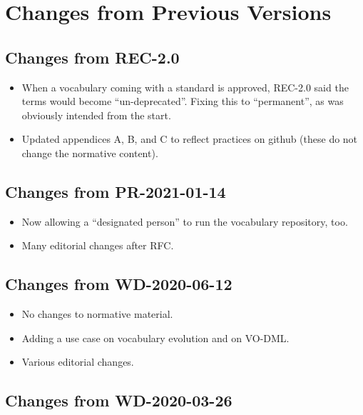 \documentclass[11pt,a4paper]{ivoa}
\begin{document}
\section{Changes from Previous Versions}

\subsection{Changes from REC-2.0}

\begin{itemize}
\item When a vocabulary coming with a standard is approved, REC-2.0 said
the terms would become ``un-deprecated''.  Fixing this to ``permanent'', as was
obviously intended from the start.

\item Updated appendices A, B, and C to reflect practices on github
(these do not change the normative content).
\end{itemize}

\subsection{Changes from PR-2021-01-14}

\begin{itemize}
\item Now allowing a ``designated person'' to run the vocabulary
repository, too.
\item Many editorial changes after RFC.
\end{itemize}

\subsection{Changes from WD-2020-06-12}

\begin{itemize}
\item No changes to normative material.
\item Adding a use case on vocabulary evolution and on VO-DML.
\item Various editorial changes.
\end{itemize}

\subsection{Changes from WD-2020-03-26}
\end{document}
